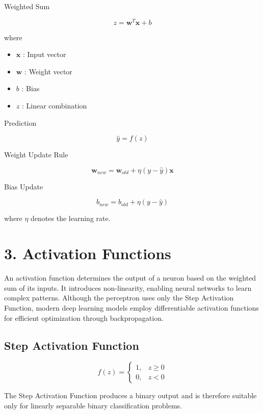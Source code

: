 \documentclass[11pt,a4paper]{article}
\begin{document}
Weighted Sum

\[
z=\mathbf{w}^{T}\mathbf{x}+b
\]

where

\begin{itemize}
\item $\mathbf{x}$ : Input vector
\item $\mathbf{w}$ : Weight vector
\item $b$ : Bias
\item $z$ : Linear combination
\end{itemize}

Prediction

\[
\hat y=f(z)
\]

Weight Update Rule

\[
\mathbf{w}_{new}
=
\mathbf{w}_{old}
+
\eta
(y-\hat y)
\mathbf{x}
\]

Bias Update

\[
b_{new}
=
b_{old}
+
\eta
(y-\hat y)
\]

where $\eta$ denotes the learning rate.


\section*{3. Activation Functions}

An activation function determines the output of a neuron based on the weighted sum of its inputs. It introduces non-linearity, enabling neural networks to learn complex patterns. Although the perceptron uses only the Step Activation Function, modern deep learning models employ differentiable activation functions for efficient optimization through backpropagation.

\subsection*{Step Activation Function}

\[
f(z)=
\begin{cases}
1,&z\ge0\\
0,&z<0
\end{cases}
\]

The Step Activation Function produces a binary output and is therefore suitable only for linearly separable binary classification problems.
\end{document}
